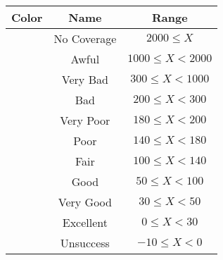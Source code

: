 \begin{tabular}{|c|c|c|}\hline
\rowcolor{Plum!20}
Color&Name&Range\\\hline\hline
\cellcolor[HTML]{aaaaaa} &No Coverage&$2000\leq X$\\\hline
\cellcolor[HTML]{820000} &Awful&$1000\leq X<2000$\\\hline
\cellcolor[HTML]{dc143c} &Very Bad&$300\leq X<1000$\\\hline
\cellcolor[HTML]{ff0000} &Bad&$200\leq X<300$\\\hline
\cellcolor[HTML]{fa6400} &Very Poor&$180\leq X<200$\\\hline
\cellcolor[HTML]{ffaa00} &Poor&$140\leq X<180$\\\hline
\cellcolor[HTML]{ffff00} &Fair&$100\leq X<140$\\\hline
\cellcolor[HTML]{00d228} &Good&$50\leq X<100$\\\hline
\cellcolor[HTML]{00a032} &Very Good&$30\leq X<50$\\\hline
\cellcolor[HTML]{00703c} &Excellent&$0\leq X<30$\\\hline
\cellcolor[HTML]{1e90ff} &Unsuccess&$-10\leq X<0$\\\hline
\end{tabular}
